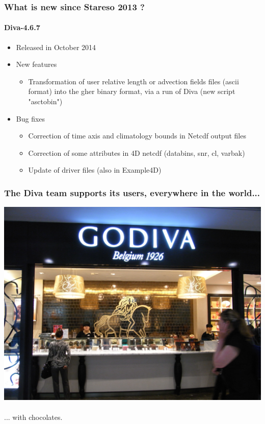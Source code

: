 \begin{frame}
  \frametitle{What is new since Stareso 2013 ?}
  \framesubtitle{Diva-4.6.7}
  \begin{itemize}
   \item Released in October 2014
   \item New features
   \begin{itemize}
   \item Transformation of user relative length or advection fields files (ascii format) into the gher binary format, via a run of Diva (new script "asctobin") 
   \end{itemize}
   \item Bug fixes
   \begin{itemize}
   \item Correction of time axis and climatology bounds in Netcdf output files %
   \item Correction of some attributes in 4D netcdf (databins, snr, cl, varbak) %
   \item Update of driver files (also in Example4D)   
   \end{itemize}
   \end{itemize}
\end{frame}
\begin{frame}
  \frametitle{The Diva team supports its users, everywhere in the world...}
  \pause
  \includegraphics[scale=0.07]{./figures/HK_Central_IFC_Mall_lunch_time_shop_GODIVA_Belgium_1926_sign_April-2012.JPG}
  ~\\
   ... with chocolates.
\end{frame}

